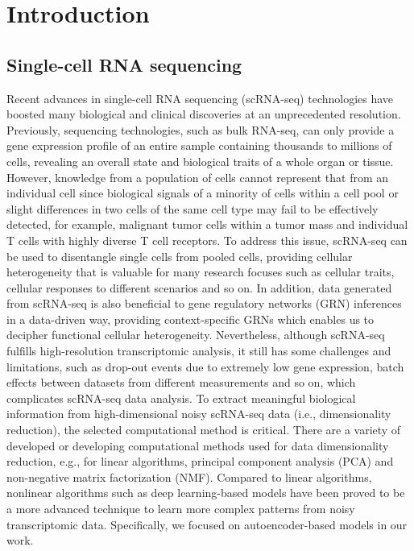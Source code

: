 \chapter{Introduction}
\section{Single-cell RNA sequencing}
Recent advances in single-cell RNA sequencing (scRNA-seq) technologies\cite{Kolodziejczyk2015} have boosted many biological and clinical discoveries at an unprecedented resolution. Previously, sequencing technologies, such as bulk RNA-seq\cite{Emrich2007}, can only provide a gene expression profile of an entire sample containing thousands to millions of cells, revealing an overall state and biological traits of a whole organ or tissue. However, knowledge from a population of cells cannot represent that from an individual cell since biological signals of a minority of cells within a cell pool or slight differences in two cells of the same cell type may fail to be effectively detected\cite{Haque2017}, for example, malignant tumor cells within a tumor mass\cite{Tirosh2016} and individual T cells with highly diverse T cell receptors\cite{Stubbington2016}. To address this issue, scRNA-seq can be used to disentangle single cells from pooled cells, providing cellular heterogeneity that is valuable for many research focuses such as cellular traits, cellular responses to different scenarios and so on. In addition, data generated from scRNA-seq is also beneficial to gene regulatory networks (GRN) inferences in a data-driven way, providing context-specific GRNs which enables us to decipher functional cellular heterogeneity\cite{Haque2017}. Nevertheless, although scRNA-seq fulfills high-resolution transcriptomic analysis, it still has some challenges and limitations, such as drop-out events due to extremely low gene expression\cite{Ran2020}, batch effects between datasets from different measurements\cite{Tran2020} and so on, which complicates scRNA-seq data analysis\cite{Liu2016}. To extract meaningful biological information from high-dimensional noisy scRNA-seq data (i.e., dimensionality reduction), the selected computational method is critical. There are a variety of developed or developing computational methods used for data dimensionality reduction, e.g., for linear algorithms, principal component analysis\cite{Jolliffe2016} (PCA) and non-negative matrix factorization\cite{Quintero2020} (NMF). Compared to linear algorithms, nonlinear algorithms such as deep learning-based models have been proved to be a more advanced technique to learn more complex patterns from noisy transcriptomic data. Specifically, we focused on autoencoder-based models in our work.

